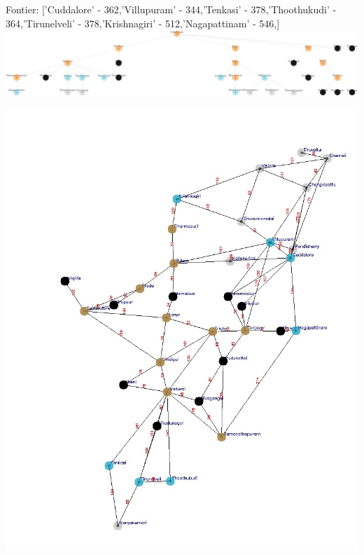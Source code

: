\documentclass[xcolor=table]{beamer}
\begin{document}
\begin{frame}
  { \tiny Fontier: ['Cuddalore' - 362,'Villupuram' - 344,'Tenkasi' - 378,'Thoothukudi' - 364,'Tirunelveli' - 378,'Krishnagiri' - 512,'Nagapattinam' - 546,]}
  \includegraphics[width=1\textwidth]{../UCSNodes/32-1.png}
  \begin{center}
    \includegraphics[height=0.55\textheight]{../UCSoutput/tamilUCS30.jpg}
  \end{center}
\end{frame}
\end{document}
